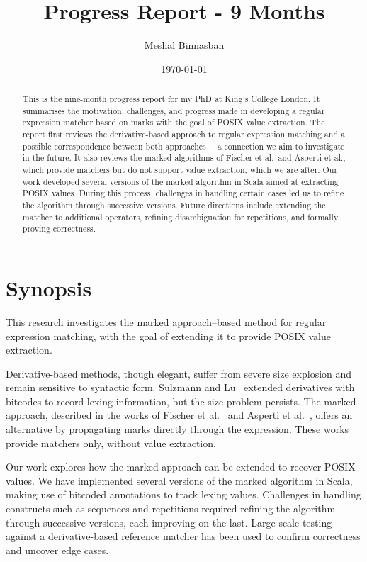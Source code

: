 \documentclass[12pt]{article}
\title{Progress Report - 9 Months}
\author{Meshal Binnasban}
\date{\today}
\begin{document}
\maketitle


\begin{abstract}
This is the nine-month progress report for my PhD at King’s College London. It summarises the motivation, challenges, and progress made in developing a
 regular expression matcher based on marks with the goal of POSIX value extraction. The report first reviews the derivative-based approach to regular 
 expression matching and a possible correspondence between both approaches —a connection we aim to investigate in the future.  
It also reviews the marked algorithms of Fischer et al.\ and Asperti et al., which provide matchers but do not support value extraction, which we are after.
Our work developed several versions of the marked algorithm in Scala aimed at extracting POSIX values.  
During this process, challenges in handling certain cases led us to refine the algorithm through successive versions.  
Future directions include extending the matcher to additional operators, refining disambiguation for repetitions, and formally proving correctness.  
\end{abstract}


\newpage

\section*{Synopsis}
This research investigates the marked approach--based method for regular expression 
matching, with the goal of extending it to provide POSIX value extraction.

Derivative-based methods, though elegant, suffer from severe size explosion and remain sensitive to syntactic form.  
Sulzmann and Lu~\cite{Sulzmann2014} extended derivatives with bitcodes to record lexing information, but the size problem persists.  
The marked approach, described in the works of Fischer et al.~\cite{Fischer2010} and Asperti et al.~\cite{Asperti2010}, offers an alternative by propagating marks directly through the expression.  
These works provide matchers only, without value extraction.  

Our work explores how the marked approach can be extended to recover POSIX values.  
We have implemented several versions of the marked algorithm in Scala, making use of bitcoded annotations to track lexing values.  
Challenges in handling constructs such as sequences and repetitions required refining the algorithm through successive versions, each improving on the last.  
Large-scale testing against a derivative-based reference matcher has been used to confirm correctness and uncover edge cases.  
\end{document}
